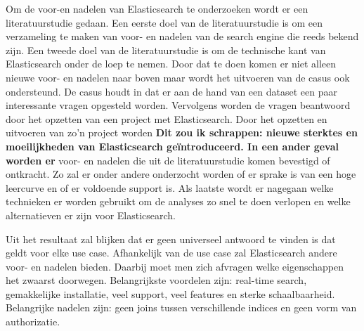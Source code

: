 Om de voor-en nadelen van Elasticsearch te onderzoeken wordt er een literatuurstudie gedaan. Een eerste doel van de literatuurstudie is om een verzameling te maken van voor- en nadelen van de search engine die reeds bekend zijn. Een tweede doel van de literatuurstudie is om de technische kant van Elasticsearch onder de loep te nemen. Door dat te doen komen er niet alleen nieuwe voor- en nadelen naar boven maar wordt het uitvoeren van de casus ook ondersteund. De casus houdt in dat er aan de hand van een dataset een paar interessante vragen opgesteld worden. Vervolgens worden de vragen beantwoord door het opzetten van een project met Elasticsearch.
Door het opzetten en uitvoeren van zo'n project worden \textbf{Dit zou ik schrappen: nieuwe sterktes en moeilijkheden van Elasticsearch geïntroduceerd. In een ander geval worden er} voor- en nadelen die uit de literatuurstudie komen bevestigd of ontkracht. Zo zal er onder andere onderzocht worden of er sprake is van een hoge leercurve en of er voldoende support is. Als laatste wordt er nagegaan welke technieken er worden gebruikt om de analyses zo snel te doen verlopen en welke alternatieven er zijn voor Elasticsearch.

Uit het resultaat zal blijken dat er geen universeel antwoord te vinden is dat geldt voor elke use case. Afhankelijk van de use case zal Elasticsearch andere voor- en nadelen bieden. Daarbij moet men zich afvragen welke eigenschappen het zwaarst doorwegen. Belangrijkste voordelen zijn: real-time search, gemakkelijke installatie, veel support, veel features en sterke schaalbaarheid. Belangrijke nadelen zijn: geen joins tussen verschillende indices en geen vorm van authorizatie.

